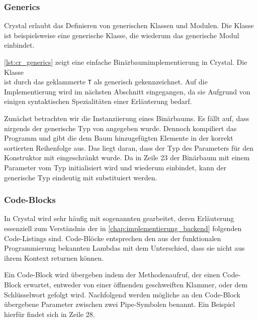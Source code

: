 \subsubsection{Generics}
\label{sssec:gsc_generics}

Crystal erlaubt das Definieren von generischen Klassen und Modulen.  Die Klasse
 ist beispielsweise eine generische Klasse, die wiederum das
generische Modul  einbindet.

\cref{lst:cr_generics} zeigt eine einfache Binärbaumimplementierung in Crystal.
Die Klasse\\ ist durch das geklammerte \texttt{T} als generisch
gekennzeichnet.  Auf die Implementierung wird im nächsten Abschnitt eingegangen,
da sie Aufgrund von einigen syntaktischen Spezialitäten einer Erläuterung
bedarf.

Zunächst betrachten wir die Instanziierung eines Binärbaums.  Es fällt auf, dass
nirgends der generische Typ von  angegeben wurde.  Dennoch
kompiliert das Programm und gibt die dem Baum hinzugefügten Elemente in der
korrekt sortierten Reihenfolge aus.  Das liegt daran, dass der Typ des
Parameters für den Konstruktor mit  eingeschränkt wurde.  Da
in Zeile 23 der Binärbaum mit einem Parameter vom Typ 
initialisiert wird und  wiederum 
einbindet, kann der generische Typ eindeutig mit  substituiert
werden.



\subsubsection{Code-Blocks}
\label{sssec:gsc_code_blocks}

In Crystal wird sehr häufig mit sogenannten 
gearbeitet, deren Erläuterung essenziell zum Verständnis der in
\cref{chap:implementierung_backend} folgenden Code-Listings sind.  Code-Blöcke
entsprechen den aus der funktionalen Programmierung bekannten Lambdas mit dem
Unterschied, dass sie nicht aus ihrem Kontext returnen können.

Ein Code-Block wird übergeben indem der Methodenaufruf, der einen Code-Block
erwartet, entweder von einer öffnenden geschweiften Klammer, oder dem
Schlüsselwort  gefolgt wird.  Nachfolgend werden mögliche an den
Code-Block übergebene Parameter zwischen zwei Pipe-Symbolen benannt.  Ein
Beispiel hierfür findet sich in Zeile 28.

